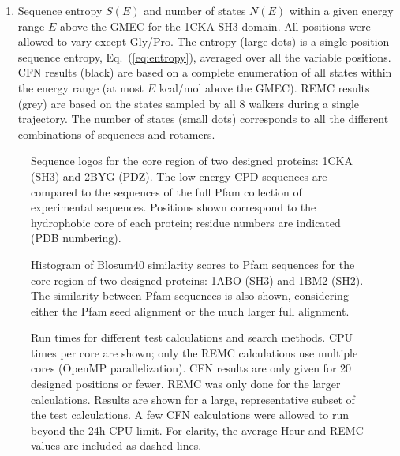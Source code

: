 \documentclass[a4paper,12pt]{article}
\begin{document}
\begin{enumerate}

\item \label{fig:entropy}
Sequence entropy $S(E)$ and number of states $N(E)$ within a given energy range $E$ above the GMEC for the 1CKA
SH3 domain. All positions were allowed to vary except Gly/Pro. The entropy (large dots) is a single position
sequence entropy, Eq.\ (\ref{eq:entropy}), averaged over all the variable positions. CFN results (black) are based
on a complete enumeration of all states within the energy range (at most $E$ kcal/mol above the GMEC). REMC results
(grey) are based on the states sampled by all 8 walkers during a single trajectory. The number of states (small dots)
corresponds to all the different combinations of sequences and rotamers.

\end{enumerate}


\begin{figure}[!h]
\caption[width=1cm]{\small 
Sequence logos for the core region of two designed proteins: 1CKA (SH3) and 2BYG (PDZ).
The low energy CPD sequences are compared to the sequences of the full Pfam collection of
experimental sequences. Positions shown correspond to the hydrophobic core of each
protein; residue numbers are indicated (PDB numbering).
}
\end{figure}


\begin{figure}[!h]
\begin{center}
\end{center}
\caption[width=1cm]{\small 
Histogram of Blosum40 similarity scores to Pfam sequences for the core region of two
designed proteins: 1ABO (SH3) and 1BM2 (SH2). The similarity between Pfam sequences is
also shown, considering either the Pfam seed alignment or the much larger full alignment.
}
\end{figure}


\begin{figure}[!h]
\begin{center}
\end{center}
\caption{\small 
Run times for different test calculations and search methods. CPU times per core are
shown; only the REMC calculations use multiple cores (OpenMP parallelization). CFN results
are only given for 20 designed positions or fewer. REMC was only done for the larger
calculations. Results are shown for a large, representative subset of the test calculations.
A few CFN calculations were allowed to run beyond the 24h CPU limit. For clarity, the
average Heur and REMC values are included as dashed lines.
}
\end{figure}
\end{document}
